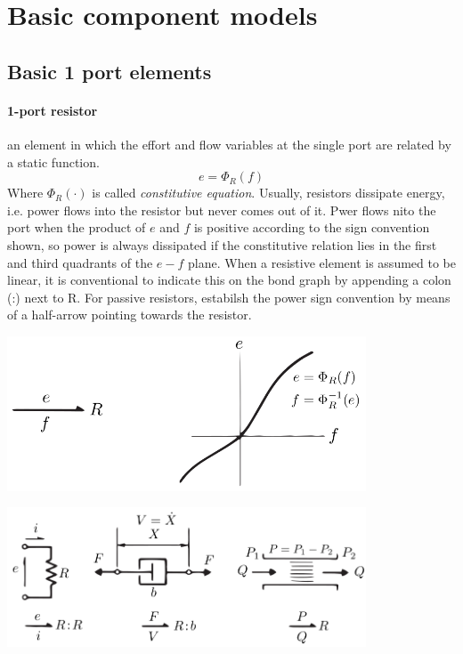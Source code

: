 \documentclass{book}
\begin{document}
\chapter{Basic component models}

\section{Basic 1 port elements}
\subsubsection{1-port resistor}
an element in which the effort and flow variables at the single port are related by a static function.
\[
    e = \Phi_R(f)
\]
Where $\Phi_R(\cdot)$ is called \emph{constitutive equation}.
Usually, resistors dissipate energy, i.e. power flows into the resistor but never comes out of it. 
Pwer flows nito the port when the product of $e$ and $f$ is positive according to the sign convention shown, so power is always dissipated if the constitutive relation lies in the first and third quadrants of the $e-f$ plane.
When a resistive element is assumed to be linear, it is conventional to indicate this on the bond graph by appending a colon (:) next to R. For passive resistors, estabilsh the power sign convention by means of a half-arrow pointing towards the resistor.
\begin{center}
\includegraphics[width=0.8\textwidth]{1portR1}
\end{center}

\begin{center}
\includegraphics[width=0.8\textwidth]{1portR2}
\end{center}
\end{document}

